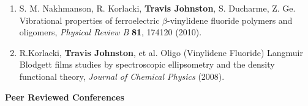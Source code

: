 \documentclass{article}
\begin{document}
\begin{enumerate}[1.]
		
		\item S. M. Nakhmanson, R. Korlacki, \textbf{Travis Johnston}, S. Ducharme, Z. Ge. Vibrational properties of ferroelectric $\beta$-vinylidene fluoride polymers and oligomers,
		\textit{Physical Review B} \textbf{81}, 174120 (2010). 


		\item R.Korlacki, \textbf{Travis Johnston}, et al. Oligo (Vinylidene Fluoride) Langmuir Blodgett films studies by spectroscopic ellipsometry and the density functional theory,
		\textit{Journal of Chemical Physics} (2008).

	\end{enumerate}

\noindent \Large \textbf{Peer Reviewed Conferences} \normalsize

\medskip
\end{document}
